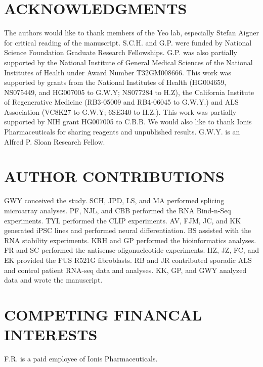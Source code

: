 \section{ACKNOWLEDGMENTS}
The authors would like to thank members of the Yeo lab, especially Stefan Aigner for critical reading of the manuscript. S.C.H. and G.P. were funded by National Science Foundation Graduate Research Fellowships. G.P. was also partially supported by the National Institute of General Medical Sciences of the National Institutes of Health under Award Number T32GM008666. This work was supported by grants from the National Institutes of Health (HG004659, NS075449, and HG007005 to G.W.Y; NS077284 to H.Z), the California Institute of Regenerative Medicine (RB3-05009 and RB4-06045 to G.W.Y.) and ALS Association (VC8K27 to G.W.Y; 6SE340 to H.Z.). This work was partially supported by NIH grant HG007005 to C.B.B. We would also like to thank Ionis Pharmaceuticals for sharing reagents and unpublished results. G.W.Y. is an Alfred P. Sloan Research Fellow.

\section{AUTHOR CONTRIBUTIONS}
GWY conceived the study. SCH, JPD, LS, and MA performed splicing microarray analyses. PF, NJL, and CBB performed the RNA Bind-n-Seq experiments. TYL performed the CLIP experiments. AV, FJM, JC, and KK generated iPSC lines and performed neural differentiation. BS assisted with the RNA stability experiments. KRH and GP performed the bioinformatics analyses. FR and SC performed the antisense-oligonucleotide experiments. HZ, JZ, FC, and EK provided the FUS R521G fibroblasts. RB and JR contributed sporadic ALS and control patient RNA-seq data and analyses. KK, GP, and GWY analyzed data and wrote the manuscript.

\section{COMPETING FINANCAL INTERESTS}
F.R. is a paid employee of Ionis Pharmaceuticals.
